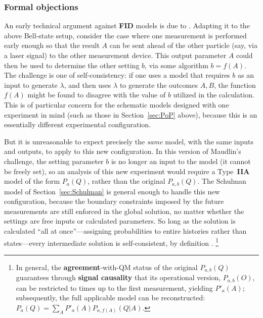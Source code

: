 \documentclass[rmp, aps, preprint, longbibliography]{revtex4-1}
\begin{document}
\subsubsection{Formal objections}

An early technical argument against {\bf FID} models is due to \textcite{maudlin1994}.  Adapting it to the above Bell-state setup, consider the case where one measurement is performed early enough so that the result $A$ can be sent ahead of the other particle (say, via a laser signal) to the other measurement device.  This output parameter $A$ could then be used to determine the other setting $b$, via some algorithm $b=f(A)$.  The challenge is one of self-consistency: if one uses a model that requires $b$ as an input to generate $\lambda$, and then uses $\lambda$ to generate the outcomes $A,B$, the function $f(A)$ might be found to disagree with the value of $b$ utilized in the calculation.  This is of particular concern for the schematic models designed with one experiment in mind (such as those in Section~\ref{sec:PoP} above), because this is an essentially different experimental configuration.

But it is unreasonable to expect precisely the \emph{same} model, with the same inputs and outputs, to apply to this new configuration.  In this version of Maudlin's challenge, the setting parameter $b$ is no longer an input to the model (it cannot be freely set), so an analysis of this new experiment would require a Type~{\bf IIA} model of the form $P_a(Q)$, rather than the original $P_{a,b}(Q)$.  The Schulman model of Section~\ref{sec:Schulman} is general enough to handle this new configuration, because the boundary constraints imposed by the future measurements are still enforced in the global solution, no matter whether the settings are free inputs or calculated parameters.  So long as the solution is calculated ``all at once''---assigning probabilities to entire histories rather than states---every intermediate solution is self-consistent, by definition \cite{berkovitz2008,lewis2013,wharton2014}.%
\footnote{In general, the {\bf agreement}-with-QM status of the original $P_{a,b}(Q)$ guarantees through {\bf signal causality} that its operational version, $P_{a,b}(O)$, can be restricted to times up to the first measurement, yielding $P'_a(A)$; subsequently, the full applicable model can be reconstructed: $P_a(Q) = \sum_A P'_a(A) P_{a,f(A)}(Q|A)$.}
\end{document}
